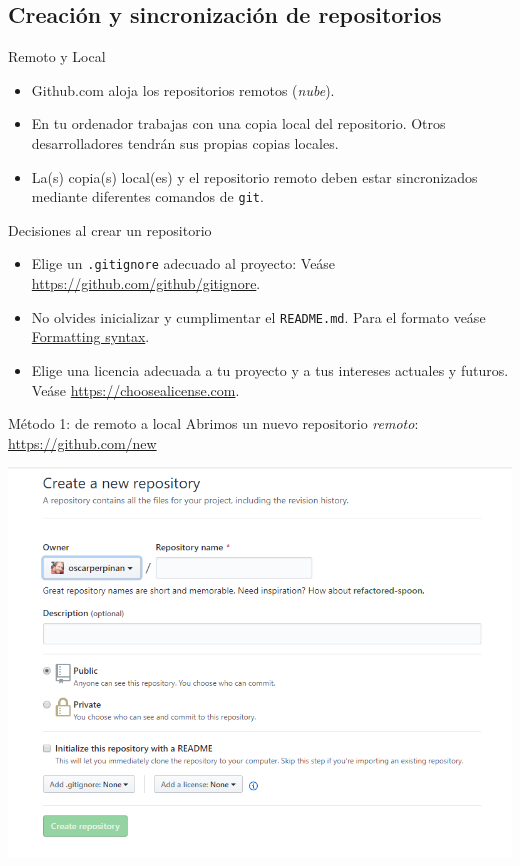\documentclass[aspectratio=169, xcolor={usenames,svgnames,dvipsnames}]{beamer}
\begin{document}
\subsection{Creación y sincronización de repositorios}
\label{sec:org71cdc55}

\begin{frame}[label={sec:orge839fca},fragile]{Remoto y Local}
 \begin{itemize}
\item \alert{Github.com} aloja los \alert{repositorios remotos} (\emph{nube}).
\item En tu ordenador trabajas con una \alert{copia local} del repositorio. Otros desarrolladores tendrán sus propias copias locales.
\item La(s) copia(s) local(es) y el repositorio remoto deben estar \alert{sincronizados} mediante diferentes comandos de \texttt{git}.
\end{itemize}
\end{frame}
\begin{frame}[label={sec:orgf0e46b5},fragile]{Decisiones al crear un repositorio}
 \begin{itemize}
\item Elige un \alert{\texttt{.gitignore}} adecuado al proyecto: Veáse \url{https://github.com/github/gitignore}.
\item No olvides inicializar y cumplimentar el \alert{\texttt{README.md}}. Para el formato veáse \href{https://help.github.com/articles/basic-writing-and-formatting-syntax/}{Formatting syntax}.
\item Elige una \alert{licencia} adecuada a tu proyecto y a tus intereses actuales y futuros. Veáse \url{https://choosealicense.com}.
\end{itemize}
\end{frame}

\begin{frame}[label={sec:org23bdab8}]{Método 1: de remoto a local}
Abrimos un nuevo repositorio \emph{remoto}: \url{https://github.com/new}

\begin{center}
\includegraphics[width=.9\linewidth]{figs/GitHub_New_Repository.png}
\end{center}
\end{frame}
\end{document}
